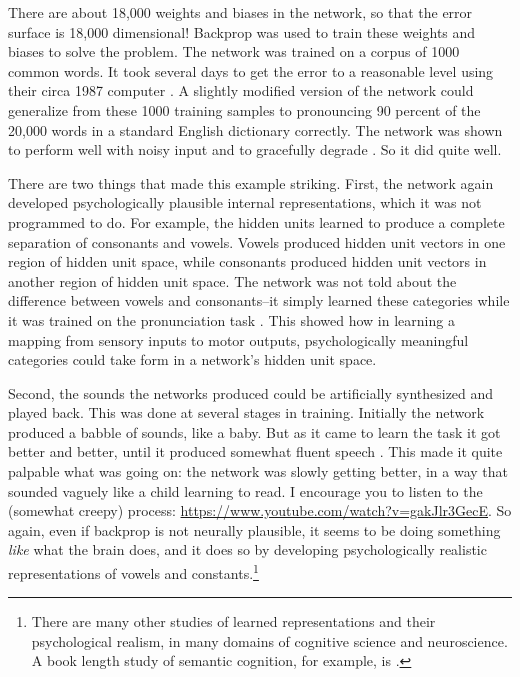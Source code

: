 There are about 18,000 weights and biases in the network, so that the error surface is 18,000 dimensional! Backprop was used to train these weights and biases to solve the problem. The network was trained on a corpus of 1000 common words. It took several days to get the error to a reasonable level using their circa 1987 computer \cite{sejnowski1987parallel}. A slightly modified version of the network could generalize from these 1000 training samples to pronouncing 90 percent of the 20,000 words in a standard English dictionary correctly. The network was shown to perform well with noisy input and to gracefully degrade \cite{sejnowski1987parallel}. So it did quite well.

There are two things that made this example striking. First, the network again developed psychologically plausible internal representations, which it was not programmed to do. For example, the hidden units learned to produce a complete separation of consonants and vowels. Vowels produced hidden unit vectors in one region of hidden unit space, while consonants produced hidden unit vectors in another region of hidden unit space. The network was not told about the difference between vowels and consonants--it simply learned these categories while it was trained on the pronunciation task \cite{sejnowski1987parallel}. This showed  how in learning a mapping from sensory inputs to motor outputs, psychologically meaningful categories could take form in a network's hidden unit space.

Second, the sounds the networks produced could be artificially synthesized and played back. This was done at several stages in training. Initially the network produced a babble of sounds, like a baby. But as it came to learn the task it got better and better, until it produced somewhat fluent speech \cite{sejnowski1987parallel}. This made it quite palpable what was going on: the network was slowly getting better, in a way that sounded vaguely like a child learning to read. I encourage you to listen to the (somewhat creepy) process: \url{https://www.youtube.com/watch?v=gakJlr3GecE}. So again, even if backprop is not neurally plausible, it seems to be doing something \emph{like} what the brain does, and it does so by developing psychologically realistic representations of vowels and constants.\footnote{There are many other studies of learned representations and their psychological realism, in many  domains of cognitive science and neuroscience. A book length  study of semantic cognition, for example, is \cite{rogers2004semantic}.}

